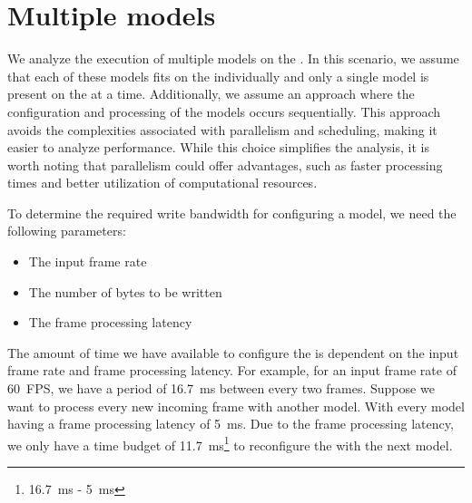 \section{Multiple models}
We analyze the execution of multiple models on the \graicore{}.
In this scenario, we assume that each of these models fits on the \graicore{} individually and only a single model is present on the \graicore{} at a time.
Additionally, we assume an approach where the configuration and processing of the models occurs sequentially.
This approach avoids the complexities associated with parallelism and scheduling, making it easier to analyze performance.
While this choice simplifies the analysis, it is worth noting that parallelism could offer advantages, such as faster processing times and better utilization of computational resources.

To determine the required write bandwidth for configuring a model, we need the following parameters:
\begin{itemize}
    \item The input frame rate
    \item The number of bytes to be written
    \item The frame processing latency
\end{itemize}

The amount of time we have available to configure the \graicore{} is dependent on the input frame rate and frame processing latency.
For example, for an input frame rate of \SI{60}{FPS}, we have a period of \SI{16.7}{ms} between every two frames.
Suppose we want to process every new incoming frame with another model.
With every model having a frame processing latency of \SI{5}{ms}. 
Due to the frame processing latency, we only have a time budget of \SI{11.7}{ms}\footnote{\SI{16.7}{ms} - \SI{5}{ms}} to reconfigure the \graicore{} with the next model.

